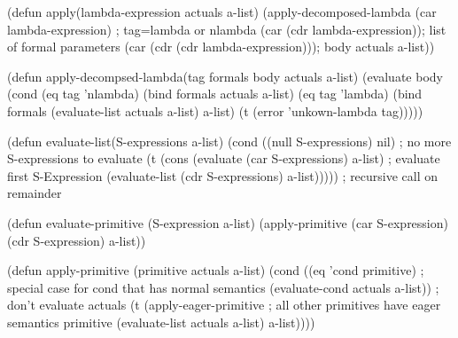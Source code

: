 \begin {frame}[fragile]
\begin {frame}[fragile]
\begin {frame}[fragile]
\begin {frame}[fragile]
\begin {frame}[fragile]
\begin {LISP}
\end {LISP}

\begin {frame}[fragile]
\begin {LISP}
(defun apply(lambda-expression actuals a-list)
  (apply-decomposed-lambda
    (car lambda-expression) ; tag=lambda or nlambda
    (car (cdr lambda-expression)); list of formal parameters
    (car (cdr (cdr lambda-expression))); body
    actuals
    a-list))

\end {LISP}

\begin {frame}[fragile]
\begin {LISP}
(defun apply-decompsed-lambda(tag formals body actuals a-list)
  (evaluate body
    (cond (eq tag 'nlambda) (bind formals actuals a-list)
          (eq tag 'lambda) (bind formals (evaluate-list actuals a-list) a-list)
          (t (error 'unkown-lambda tag)))))

\end {LISP}

\begin {frame}[fragile]
\begin {LISP}
(defun evaluate-list(S-expressions a-list)
  (cond ((null S-expressions) nil) ; no more S-expressions to evaluate
    (t (cons
          (evaluate (car S-expressions) a-list) ; evaluate first S-Expression
          (evaluate-list (cdr S-expressions) a-list))))) ; recursive call on remainder

\end {LISP}

\begin {frame}[fragile]
\begin {LISP}
(defun evaluate-primitive (S-expression a-list)
  (apply-primitive (car S-expression) (cdr S-expression) a-list))

\end {LISP}

\begin {frame}[fragile]
\begin {LISP}
(defun apply-primitive (primitive actuals a-list)
  (cond ((eq 'cond primitive) ; special case for cond that has normal semantics
            (evaluate-cond actuals a-list)) ; don't evaluate actuals
        (t (apply-eager-primitive ; all other primitives have eager semantics
              primitive
              (evaluate-list actuals a-list)
              a-list))))

\end {LISP}


\end{frame}
\end{frame}
\end{frame}
\end{frame}
\end{frame}
\end{frame}
\end{frame}
\end{frame}
\end{frame}
\end{frame}
